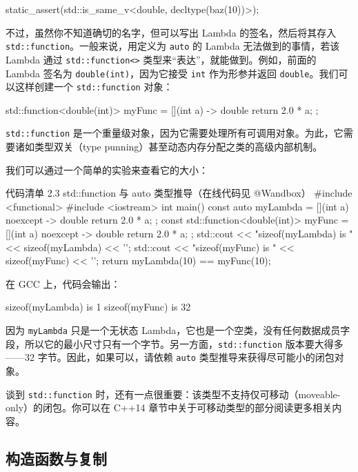\begin{codebox}
static_assert(std::is_same_v<double, decltype(baz(10))>);
\end{codebox}

不过，虽然你不知道确切的名字，但可以写出 Lambda 的签名，然后将其存入 \texttt{std::function}。一般来说，用定义为 \texttt{auto} 的 Lambda 无法做到的事情，若该 Lambda 通过 \texttt{std::function<>} 类型来“表达”，就能做到。例如，前面的 Lambda 签名为 \texttt{double(int)}，因为它接受 \texttt{int} 作为形参并返回 \texttt{double}。我们可以这样创建一个 \texttt{std::function} 对象：

\begin{codebox}
std::function<double(int)> myFunc = [](int a) -> double { return 2.0 * a; };
\end{codebox}

\texttt{std::function} 是一个重量级对象，因为它需要处理所有可调用对象。为此，它需要诸如类型双关（type punning）甚至动态内存分配之类的高级内部机制。

我们可以通过一个简单的实验来查看它的大小：

\begin{codeboxt}{代码清单 2.3 std::function 与 auto 类型推导（在线代码见 @Wandbox）}
#include <functional>
#include <iostream>
int main() {
const auto myLambda = [](int a) noexcept -> double {
return 2.0 * a;
};
const std::function<double(int)> myFunc =
[](int a) noexcept -> double {
return 2.0 * a;
};
std::cout << "sizeof(myLambda) is " << sizeof(myLambda) << '\n';
std::cout << "sizeof(myFunc) is " << sizeof(myFunc) << '\n';
return myLambda(10) == myFunc(10);
}
\end{codeboxt}

在 GCC 上，代码会输出：

\begin{codebox}
sizeof(myLambda) is 1
sizeof(myFunc) is 32
\end{codebox}

因为 \texttt{myLambda} 只是一个无状态 Lambda，它也是一个空类，没有任何数据成员字段，所以它的最小尺寸只有一个字节。另一方面，\texttt{std::function} 版本要大得多——32 字节。因此，如果可以，请依赖 \texttt{auto} 类型推导来获得尽可能小的闭包对象。

谈到 \texttt{std::function} 时，还有一点很重要：该类型不支持仅可移动（moveable-only）的闭包。你可以在 C++14 章节中关于可移动类型的部分阅读更多相关内容。

\subsection{构造函数与复制}

